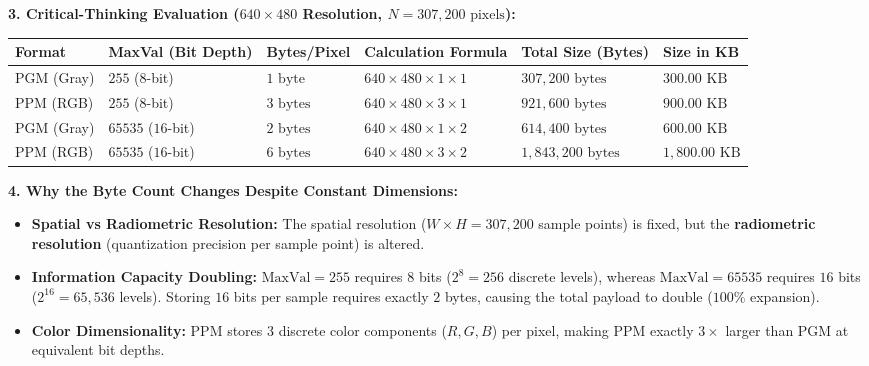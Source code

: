 \documentclass[12pt]{article}
\begin{document}
\textbf{3. Critical-Thinking Evaluation ($640 \times 480$ Resolution, $N = 307,200\text{ pixels}$):}
\begin{table}[H]
\centering
\small
\begin{tabular}{@{}llllll@{}}
\toprule
\textbf{Format} & \textbf{MaxVal (Bit Depth)} & \textbf{Bytes/Pixel} & \textbf{Calculation Formula} & \textbf{Total Size (Bytes)} & \textbf{Size in KB} \\ \midrule
PGM (Gray) & $255$ ($8$-bit) & $1\text{ byte}$ & $640 \times 480 \times 1 \times 1$ & $307,200\text{ bytes}$ & $300.00\text{ KB}$ \\
PPM (RGB) & $255$ ($8$-bit) & $3\text{ bytes}$ & $640 \times 480 \times 3 \times 1$ & $921,600\text{ bytes}$ & $900.00\text{ KB}$ \\
PGM (Gray) & $65535$ ($16$-bit) & $2\text{ bytes}$ & $640 \times 480 \times 1 \times 2$ & $614,400\text{ bytes}$ & $600.00\text{ KB}$ \\
PPM (RGB) & $65535$ ($16$-bit) & $6\text{ bytes}$ & $640 \times 480 \times 3 \times 2$ & $1,843,200\text{ bytes}$ & $1,800.00\text{ KB}$ \\ \bottomrule
\end{tabular}
\end{table}

\textbf{4. Why the Byte Count Changes Despite Constant Dimensions:}
\begin{itemize}
    \item \textbf{Spatial vs Radiometric Resolution:} The spatial resolution ($W \times H = 307,200$ sample points) is fixed, but the \textbf{radiometric resolution} (quantization precision per sample point) is altered.
    \item \textbf{Information Capacity Doubling:} $\text{MaxVal}=255$ requires $8$ bits ($2^8 = 256$ discrete levels), whereas $\text{MaxVal}=65535$ requires $16$ bits ($2^{16} = 65,536$ levels). Storing $16$ bits per sample requires exactly $2$ bytes, causing the total payload to double ($100\%$ expansion).
    \item \textbf{Color Dimensionality:} PPM stores 3 discrete color components ($R, G, B$) per pixel, making PPM exactly $3\times$ larger than PGM at equivalent bit depths.
\end{itemize}
\end{document}
